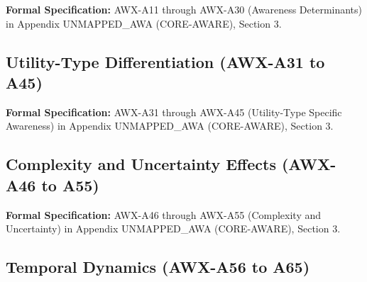 

\begin{cross-reference}
\textbf{Formal Specification:} AWX-A11 through AWX-A30 (Awareness Determinants) in
Appendix UNMAPPED_AWA (CORE-AWARE), Section 3.
\end{cross-reference}

\subsection{Utility-Type Differentiation (AWX-A31 to A45)}
\label{subsec:11-8-utility-type}



\begin{cross-reference}
\textbf{Formal Specification:} AWX-A31 through AWX-A45 (Utility-Type Specific Awareness) in
Appendix UNMAPPED_AWA (CORE-AWARE), Section 3.
\end{cross-reference}

\subsection{Complexity and Uncertainty Effects (AWX-A46 to A55)}
\label{subsec:11-9-complexity}



\begin{cross-reference}
\textbf{Formal Specification:} AWX-A46 through AWX-A55 (Complexity and Uncertainty) in
Appendix UNMAPPED_AWA (CORE-AWARE), Section 3.
\end{cross-reference}

\subsection{Temporal Dynamics (AWX-A56 to A65)}
\label{subsec:11-10-temporal}

